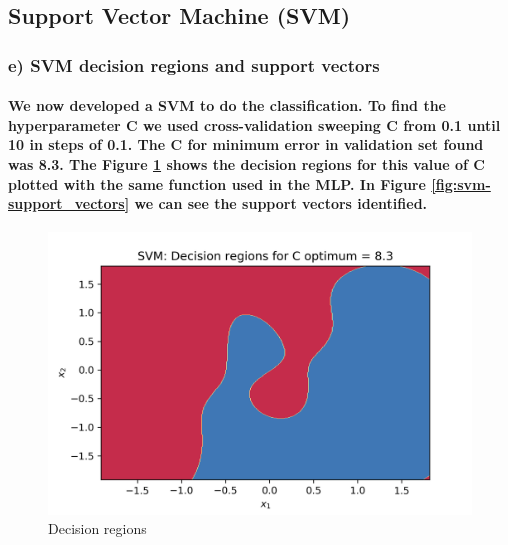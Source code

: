 \documentclass[a4paper]{article}    %
\begin{document}
\newpage
\subsection{Support Vector Machine (SVM)}

\subsubsection{e) SVM decision regions and support vectors}

\paragraph{We now developed a SVM to do the classification. To find the hyperparameter C we used cross-validation sweeping C from 0.1 until 10 in steps of 0.1. The C for minimum error in validation set found was 8.3. The Figure \ref{fig:svm-decision_regions} shows the decision regions for this value of C plotted with the same function used in the MLP. In Figure \ref{fig:svm-support_vectors} we can see the support vectors identified.}

\begin{figure}[H]
    \centering
    \includegraphics[width=12cm]{svm_decision_region}
    \caption{Decision regions}
    \label{fig:svm-decision_regions}
\end{figure}
\end{document}
